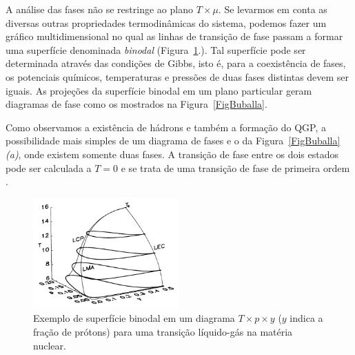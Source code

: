 A análise das fases não se restringe ao plano $T \times \mu$. Se levarmos em conta as diversas outras propriedades termodinâmicas do sistema, podemos fazer um gráfico multidimensional no qual as linhas de transição de fase passam a formar uma superfície denominada \emph{binodal} (Figura~\ref{Fig:binodal}\parencite{MuellerSerot}.). Tal superfície pode ser determinada através das condições de Gibbs, isto é, para a coexistência de fases, os potenciais químicos, temperaturas e pressões de duas fases distintas devem ser iguais. As projeções da superfície binodal em um plano particular geram diagramas de fase como os mostrados na Figura~\ref{FigBuballa}\parencite{Buballa}.

Como observamos a existência de hádrons e também a formação do QGP, a possibilidade mais simples de um diagrama de fases e o da Figura~\ref{FigBuballa} \emph{(a)}, onde existem somente duas fases. A transição de fase entre os dois estados pode ser calculada a $T = 0$ e se trata de uma transição de fase de primeira ordem \parencite{Stephanov2004}. 

\begin{figure}
	\includegraphics[width=0.5\textwidth]{Figures/binodal_mueller_serot.png}
	\caption{Exemplo de superfície binodal em um diagrama $T \times p \times y$ ($y$ indica a fração de prótons) para uma transição líquido-gás na matéria nuclear.}
	\label{Fig:binodal}
\end{figure}

